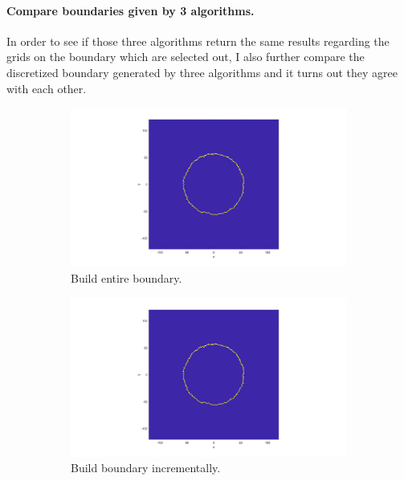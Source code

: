 \documentclass[letterpaper]{article}
\numberwithin{equation}{section} %
\numberwithin{figure}{section} %
\numberwithin{table}{section} %
\begin{document}
\paragraph{Compare boundaries given by 3 algorithms.}
In order to see if those three algorithms return the same results regarding the grids on the boundary which are selected out, I also further compare the discretized boundary generated by three algorithms and it turns out they agree with each other.


\begin{figure}[htbp]
	\centering
	\begin{subfigure}[b]{0.3\textwidth}
		\includegraphics[width=\textwidth]{3bdry1}
		\caption{Build entire boundary.}
		\label{3bdry1}
	\end{subfigure}
	\begin{subfigure}[b]{0.3\textwidth}
		\includegraphics[width=\textwidth]{3bdry2}
		\caption{Build boundary incrementally.}
		\label{3bdry2}
	\end{subfigure}
	\begin{subfigure}[b]{0.3\textwidth}

\end{subfigure}
\end{figure}
\end{document}
